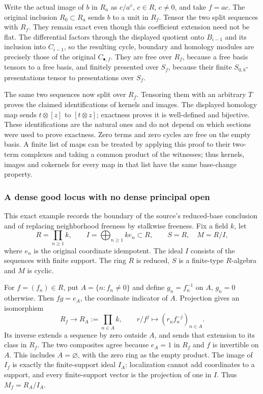 Write the actual image of \(b\) in \(R_a\) as \(c/a^v\), \(c\in R\), \(c\ne0\), and take \(f=ac\). The original inclusion \(R_0\subset R_a\) sends \(b\) to a unit in \(R_f\). Tensor the two split sequences with \(R_f\). They remain exact even though this coefficient extension need not be flat. The differential factors through the displayed quotient onto \(B_{i-1}\) and its inclusion into \(C_{i-1}\), so the resulting cycle, boundary and homology modules are precisely those of the original \(C_{\bullet,f}\). They are free over \(R_f\), because a free basis tensors to a free basis, and finitely presented over \(S_f\), because their finite \(S_{0,b}\)-presentations tensor to presentations over \(S_f\).

The same two sequences now split over \(R_f\). Tensoring them with an arbitrary \(T\) proves the claimed identifications of kernels and images. The displayed homology map sends \(t\otimes[z]\) to \([t\otimes z]\); exactness proves it is well-defined and bijective. These identifications are the natural ones and do not depend on which sections were used to prove exactness. Zero terms and zero cycles are free on the empty basis. A finite list of maps can be treated by applying this proof to their two-term complexes and taking a common product of the witnesses; thus kernels, images and cokernels for every map in that list have the same base-change property.

\subsubsection{A dense good locus with no dense principal open}\label{algebra-proof-027-a-dense-good-locus-with-no-dense-principal-open}

This exact example records the boundary of the source's reduced-base conclusion and of replacing neighborhood freeness by stalkwise freeness. Fix a field \(k\), let \[
 R=\prod_{n\ge1}k,\qquad I=\bigoplus_{n\ge1} k e_n\subset R,\qquad
 S=R,\quad M=R/I,
\] where \(e_n\) is the original coordinate idempotent. The ideal \(I\) consists of the sequences with finite support. The ring \(R\) is reduced, \(S\) is a finite-type \(R\)-algebra and \(M\) is cyclic.

For \(f=(f_n)\in R\), put \(A=\{n:f_n\ne0\}\) and define \(g_n=f_n^{-1}\) on \(A\), \(g_n=0\) otherwise. Then \(fg=e_A\), the coordinate indicator of \(A\). Projection gives an isomorphism \[
 R_f\longrightarrow R_A:=\prod_{n\in A}k,\qquad
 r/f^j\longmapsto (r_n f_n^{-j})_{n\in A}.
\] Its inverse extends a sequence by zero outside \(A\), and sends that extension to its class in \(R_f\). The two composites agree because \(e_A=1\) in \(R_f\) and \(f\) is invertible on \(A\). This includes \(A=\varnothing\), with the zero ring as the empty product. The image of \(I_f\) is exactly the finite-support ideal \(I_A\): localization cannot add coordinates to a support, and every finite-support vector is the projection of one in \(I\). Thus \(M_f=R_A/I_A\).

